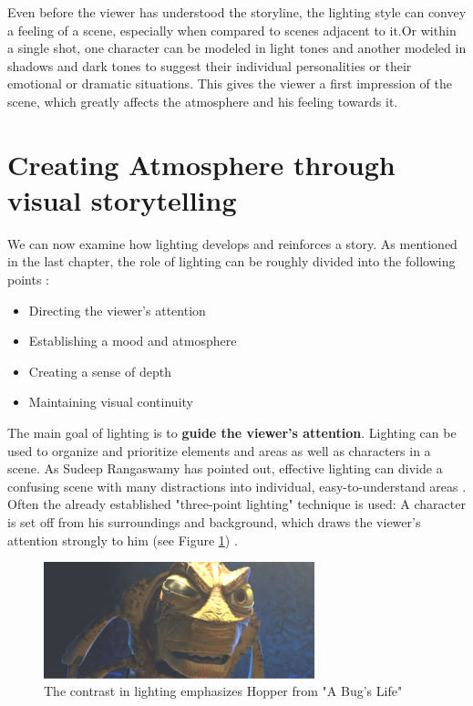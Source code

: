 Even before the viewer has understood the storyline, the lighting style can convey a feeling of a scene, especially when compared to scenes adjacent to it.Or within a single shot, one character can be modeled in light tones and another modeled in shadows and dark tones to suggest their individual personalities or their emotional or dramatic situations. This gives the viewer a first impression of the scene, which greatly affects the atmosphere and his feeling towards it\cite{Storytelling}.

\section{Creating Atmosphere through visual storytelling}
We can now examine how lighting develops and reinforces a story. As mentioned in the last chapter, the role of lighting can be roughly divided into the following  points \cite{sudeep} \cite{Storytelling}:

\begin{itemize}
    \item Directing the viewer’s attention
    \item Establishing a mood and atmosphere
    \item Creating a sense of depth
    \item Maintaining visual continuity
\end{itemize}

The main goal of lighting is to \textbf{guide the viewer's attention}. Lighting can be used to organize and prioritize elements and areas as well as characters in a scene. As Sudeep Rangaswamy has pointed out, effective lighting can divide a confusing scene with many distractions into individual, easy-to-understand areas \cite{sudeep}. Often the already established "three-point lighting" technique is used: A character is set off from his surroundings and background, which draws the viewer's attention strongly to him (see Figure \ref{fig:hopper}) \cite{Storytelling}. 

\begin{figure}[H]
	\centering
		\includegraphics[width=0.7\textwidth]{Bilder/hopper.PNG}
	\caption{The contrast in lighting emphasizes Hopper from "A Bug's Life" \cite{bugslife}}
	\label{fig:hopper}
\end{figure}

